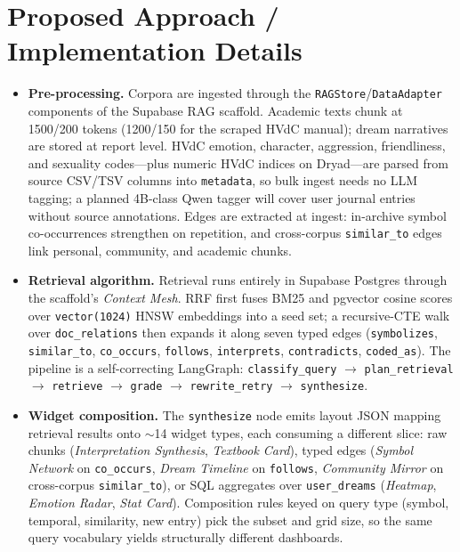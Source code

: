 \documentclass[paper=a4, fontsize=11pt]{scrartcl}
\begin{document}
\section{Proposed Approach / Implementation Details}

\begin{itemize}
  \item \textbf{Pre-processing.} Corpora are ingested through the
  \texttt{RAGStore}/\texttt{DataAdapter} components of the Supabase RAG
  scaffold. Academic texts chunk at 1500/200 tokens (1200/150 for the
  scraped HVdC manual); dream narratives are stored at report level. HVdC
  emotion, character, aggression, friendliness, and sexuality codes---plus
  numeric HVdC indices on Dryad---are parsed from source CSV/TSV columns
  into \texttt{metadata}, so bulk ingest needs no LLM tagging; a planned
  4B-class Qwen tagger will cover user journal entries without source
  annotations. Edges are extracted at ingest: in-archive symbol
  co-occurrences strengthen on repetition, and cross-corpus
  \texttt{similar\_to} edges link personal, community, and academic chunks.

  \item \textbf{Retrieval algorithm.} Retrieval runs entirely in Supabase
  Postgres through the scaffold's \emph{Context Mesh}. RRF first fuses BM25
  and pgvector cosine scores over \texttt{vector(1024)} HNSW embeddings
  into a seed set; a recursive-CTE walk over \texttt{doc\_relations} then
  expands it along seven typed edges (\texttt{symbolizes},
  \texttt{similar\_to}, \texttt{co\_occurs}, \texttt{follows},
  \texttt{interprets}, \texttt{contradicts}, \texttt{coded\_as}). The pipeline is a self-correcting LangGraph:
  \texttt{classify\_query} $\rightarrow$ \texttt{plan\_retrieval}
  $\rightarrow$ \texttt{retrieve} $\rightarrow$ \texttt{grade}
  $\rightarrow$ \texttt{rewrite\_retry} $\rightarrow$
  \texttt{synthesize}.

  \item \textbf{Widget composition.} The \texttt{synthesize} node emits
  layout JSON mapping retrieval results onto $\sim$14 widget types, each
  consuming a different slice: raw chunks (\emph{Interpretation Synthesis},
  \emph{Textbook Card}), typed edges (\emph{Symbol Network} on
  \texttt{co\_occurs}, \emph{Dream Timeline} on \texttt{follows},
  \emph{Community Mirror} on cross-corpus \texttt{similar\_to}), or SQL
  aggregates over \texttt{user\_dreams} (\emph{Heatmap}, \emph{Emotion
  Radar}, \emph{Stat Card}). Composition rules keyed on query type
  (symbol, temporal, similarity, new entry) pick the subset and grid size,
  so the same query vocabulary yields structurally different dashboards.


\end{itemize}
\end{document}
